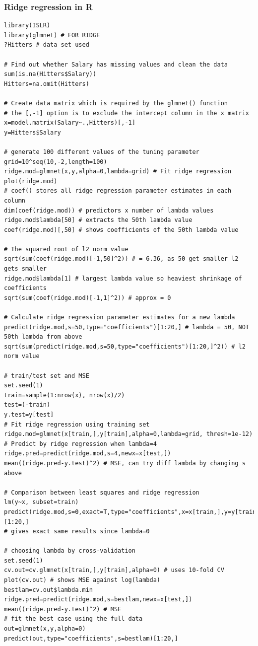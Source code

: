 \documentclass[11pt]{article}
\begin{document}
\subsubsection{Ridge regression in R}
\begin{lstlisting}
library(ISLR)
library(glmnet) # FOR RIDGE
?Hitters # data set used

# Find out whether Salary has missing values and clean the data
sum(is.na(Hitters$Salary))
Hitters=na.omit(Hitters)

# Create data matrix which is required by the glmnet() function
# the [,-1] option is to exclude the intercept column in the x matrix
x=model.matrix(Salary~.,Hitters)[,-1]
y=Hitters$Salary

# generate 100 different values of the tuning parameter
grid=10^seq(10,-2,length=100)
ridge.mod=glmnet(x,y,alpha=0,lambda=grid) # Fit ridge regression
plot(ridge.mod)
# coef() stores all ridge regression parameter estimates in each column
dim(coef(ridge.mod)) # predictors x number of lambda values
ridge.mod$lambda[50] # extracts the 50th lambda value
coef(ridge.mod)[,50] # shows coefficients of the 50th lambda value

# The squared root of l2 norm value
sqrt(sum(coef(ridge.mod)[-1,50]^2)) # = 6.36, as 50 get smaller l2 gets smaller
ridge.mod$lambda[1] # largest lambda value so heaviest shrinkage of coefficients
sqrt(sum(coef(ridge.mod)[-1,1]^2)) # approx = 0

# Calculate ridge regression parameter estimates for a new lambda
predict(ridge.mod,s=50,type="coefficients")[1:20,] # lambda = 50, NOT 50th lambda from above
sqrt(sum(predict(ridge.mod,s=50,type="coefficients")[1:20,]^2)) # l2 norm value

# train/test set and MSE
set.seed(1)
train=sample(1:nrow(x), nrow(x)/2)
test=(-train)
y.test=y[test]
# Fit ridge regression using training set
ridge.mod=glmnet(x[train,],y[train],alpha=0,lambda=grid, thresh=1e-12)
# Predict by ridge regression when lambda=4
ridge.pred=predict(ridge.mod,s=4,newx=x[test,])
mean((ridge.pred-y.test)^2) # MSE, can try diff lambda by changing s above

# Comparison between least squares and ridge regression
lm(y~x, subset=train)
predict(ridge.mod,s=0,exact=T,type="coefficients",x=x[train,],y=y[train])[1:20,]
# gives exact same results since lambda=0

# choosing lambda by cross-validation
set.seed(1)
cv.out=cv.glmnet(x[train,],y[train],alpha=0) # uses 10-fold CV
plot(cv.out) # shows MSE against log(lambda)
bestlam=cv.out$lambda.min
ridge.pred=predict(ridge.mod,s=bestlam,newx=x[test,])
mean((ridge.pred-y.test)^2) # MSE
# fit the best case using the full data
out=glmnet(x,y,alpha=0)
predict(out,type="coefficients",s=bestlam)[1:20,]
\end{lstlisting}
\end{document}

